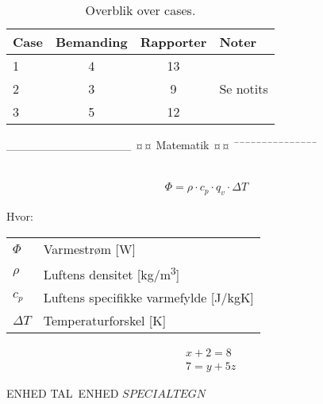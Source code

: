 \begin{table}[H]
	\centering
	\begin{tabular}{lccl}	%
		\toprule
		Case & Bemanding & Rapporter & Noter \\\midrule
		1 & 4 & 13 &            \\
		2 & 3 & 9  & Se notits  \\
		3 & 5 & 12 &            \\
		\bottomrule
	\end{tabular}
	\caption{Overblik over cases.}
	\label{tab:cases}
\end{table}



_______________
¤¤ Matematik ¤¤
¯¯¯¯¯¯¯¯¯¯¯¯¯¯¯

\begin{align}
		
	\label{eq:LABEL} %
\end{align}

\begin{align}
	\Phi = \rho \cdot c_p \cdot q_v \cdot \Delta T
	\label{eq:varmeflux}
\end{align}

Hvor:
\begin{table}[H]
	\begin{tabular}{l|l}
	$\Phi$     & Varmestrøm [\si{W}] \\
	$\rho$ 	   & Luftens densitet [\si{kg/m^3}] \\
	$c_p$ 	   & Luftens specifikke varmefylde [\si{J/kgK}] \\
	$\Delta T$ & Temperaturforskel [\si{K}]
	\end{tabular}
\end{table}

\begin{align}
& x + 2 = 8 	\label{eq:lign1} \\ 	%
& 7 = y + 5 z 	\label{eq:lign2}
\end{align}

\si{ENHED}
\SI{TAL}{ENHED}
$SPECIALTEGN$

